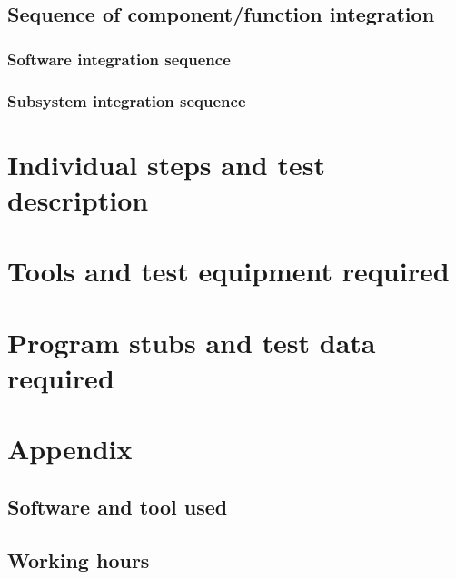 \documentclass[]{report}
\begin{document}
	\section{Sequence of component/function integration}
	
	
		\subsection{Software integration sequence}
		
	
		\subsection{Subsystem integration sequence}
		

\chapter{Individual steps and test description}


\chapter{Tools and test equipment required}


\chapter{Program stubs and test data required}


\appendix

\chapter{Appendix}

	\section{Software and tool used}
	

	\section{Working hours}
	
\end{document}
